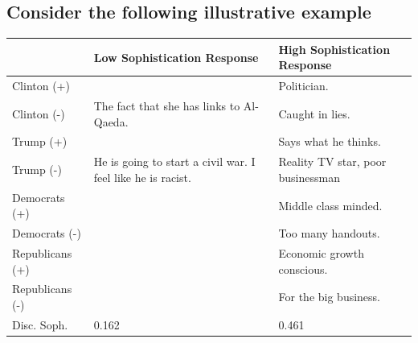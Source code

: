 \documentclass[a0,landscape]{a0poster}
\begin{document}
\begin{multicols}{4}
\section*{Consider the following illustrative example}
\begin{center}\footnotesize
\begin{tabular}{l|p{11cm}|p{9cm}}
\toprule
	& Low Sophistication Response & High Sophistication Response \\ \midrule
Clinton (+)		& 																& Politician. \\\hdashline
Clinton (-)		& The fact that she has links to Al-Qaeda. 						& Caught in lies. \\\hdashline
Trump (+)		& 																& Says what he thinks. \\\hdashline
Trump (-)		& He is going to start a civil war. I feel like he is racist. 	& Reality TV star, poor businessman \\\hdashline
Democrats (+)	& 																& Middle class minded. \\\hdashline
Democrats (-)	& 																& Too many handouts. \\\hdashline
Republicans (+)	& 																& Economic growth conscious. \\\hdashline
Republicans (-)	& 																& For the big business. \\\midrule
Disc. Soph. 	& 0.162 														& 0.461 \\\bottomrule
\end{tabular}
\end{center}



\end{multicols}
\end{document}
